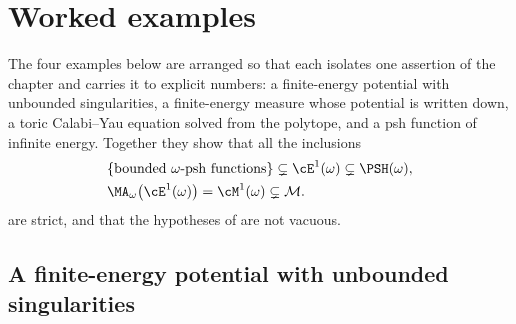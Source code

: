 \section{Worked examples}
\label{sec:ch47-examples}

The four examples below are arranged so that each isolates one assertion of
the chapter and carries it to explicit numbers: a finite-energy potential
with unbounded singularities, a finite-energy measure whose potential is
written down, a toric Calabi--Yau equation solved from the polytope, and a
psh function of infinite energy.  Together they show that all the
inclusions
\[
 \begin{aligned}
 &\{\text{bounded $\omega$-psh functions}\}\subsetneq\cE^1(\omega)
   \subsetneq\PSH(\omega),\\
 &\MA_\omega\bigl(\cE^1(\omega)\bigr)=\cM^1(\omega)\subsetneq\mathcal M.
 \end{aligned}
\]
are strict, and that the hypotheses of
 are not vacuous.

\subsection{A finite-energy potential with unbounded singularities}
\label{sec:ch47-ex-unbounded}

